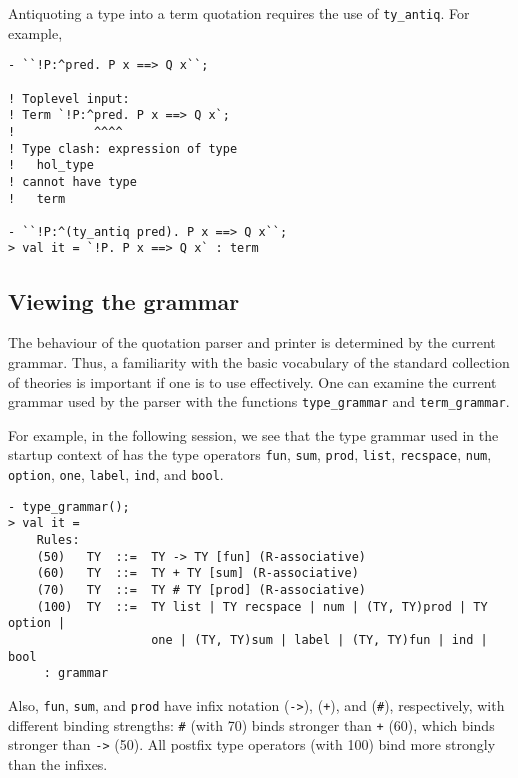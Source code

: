 \noindent Antiquoting a type into a term quotation requires the use of
{\verb+ty_antiq+}. For example,%
%

\begin{session}
\begin{verbatim}
- ``!P:^pred. P x ==> Q x``;

! Toplevel input:
! Term `!P:^pred. P x ==> Q x`;
!           ^^^^
! Type clash: expression of type
!   hol_type
! cannot have type
!   term

- ``!P:^(ty_antiq pred). P x ==> Q x``;
> val it = `!P. P x ==> Q x` : term
\end{verbatim}
\end{session}

\subsection{Viewing the grammar}

The behaviour of the \HOL{} quotation parser and printer is determined
by the current grammar. Thus, a familiarity with the basic vocabulary
of the standard collection of \HOL{} theories is important if one is
to use \HOL{} effectively. One can examine the current grammar used by
the parser with the functions \verb+type_grammar+ and
\verb+term_grammar+.

For example, in the following session, we see that the type grammar
used in the startup context of \HOL{} has the type operators
\verb+fun+, \verb+sum+, \verb+prod+, \verb+list+, \verb+recspace+,
\verb+num+, \verb+option+, \verb+one+, \verb+label+, \verb+ind+, and
\verb+bool+.

\setcounter{sessioncount}{1}
\begin{session}
\begin{verbatim}
- type_grammar();
> val it =
    Rules:
    (50)   TY  ::=  TY -> TY [fun] (R-associative)
    (60)   TY  ::=  TY + TY [sum] (R-associative)
    (70)   TY  ::=  TY # TY [prod] (R-associative)
    (100)  TY  ::=  TY list | TY recspace | num | (TY, TY)prod | TY option |
                    one | (TY, TY)sum | label | (TY, TY)fun | ind | bool
     : grammar
\end{verbatim}
\end{session}

Also, \verb+fun+, \verb+sum+, and \verb+prod+ have infix
notation (\verb+->+), (\verb|+|), and (\verb+#+), respectively, with
different binding strengths: \verb+#+ (with 70) binds stronger than
\verb|+| (60), which  binds stronger than \verb+->+ (50). All postfix
type operators (with 100) bind more strongly than the infixes.

